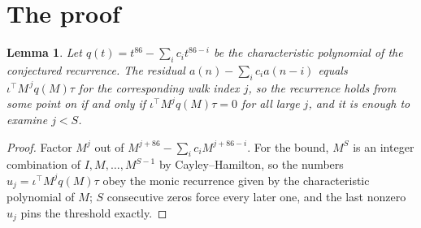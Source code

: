 \documentclass[11pt,a4paper]{article}
\theoremstyle{plain}
\newtheorem{lemma}[theorem]{Lemma}
\theoremstyle{definition}
\begin{document}
\section{The proof}

\begin{lemma}\label{lem:crit}
Let $q(t)=t^{86}-\sum_i c_it^{86-i}$ be the characteristic polynomial of the
conjectured recurrence. The residual $a(n)-\sum_ic_ia(n-i)$ equals
$\iota^{\!\top}M^{\,j}q(M)\tau$ for the corresponding walk index $j$, so the recurrence
holds from some point on if and only if $\iota^{\!\top}M^{j}q(M)\tau=0$ for all large $j$,
and it is enough to examine $j<S$.
\end{lemma}

\begin{proof}
Factor $M^{j}$ out of $M^{j+86}-\sum_ic_iM^{j+86-i}$. For the bound, $M^{S}$
is an integer combination of $I,M,\dots,M^{S-1}$ by Cayley--Hamilton, so the numbers
$u_j=\iota^{\!\top}M^{j}q(M)\tau$ obey the monic recurrence given by the characteristic
polynomial of $M$; $S$ consecutive zeros force every later one, and the last nonzero $u_j$
pins the threshold exactly.
\end{proof}
\end{document}

